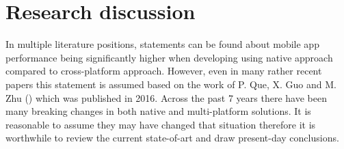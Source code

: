 
\chapter{Research discussion}

In multiple literature positions, statements can be found about mobile app performance being significantly higher when developing using native approach compared to cross-platform approach. However, even in many rather recent papers this statement is assumed based on the work of P. Que, X. Guo and M. Zhu (\cite{que_comp_hybrid_native}) which was published in 2016. Across the past 7 years there have been many breaking changes in both native and multi-platform solutions. It is reasonable to assume they may have changed that situation therefore it is worthwhile to review the current state-of-art and draw present-day conclusions.
